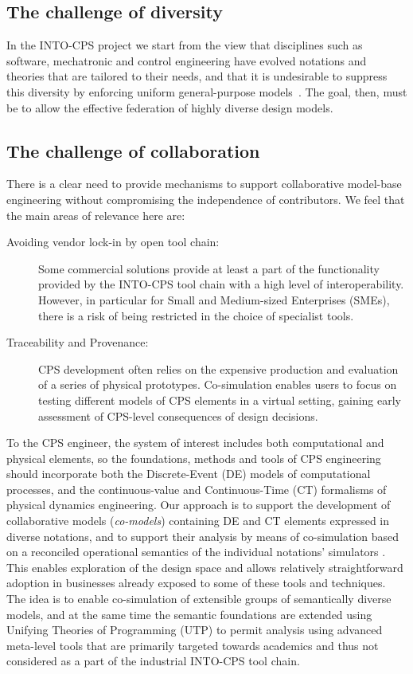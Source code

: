 \subsection{The challenge of diversity}

In the INTO-CPS project we start from the view that disciplines such as software, mechatronic and control engineering have evolved notations and theories that are tailored to their needs, and that it is undesirable to suppress this diversity by enforcing uniform general-purpose models~\cite{Fitzgerald&15,Larsen&16e}. The goal, then, must be to allow the effective federation of highly diverse design models.

\subsection{The challenge of collaboration}

There is a clear need to provide mechanisms to support collaborative model-base engineering without compromising the independence of contributors. We feel that the main areas of relevance here are:

\begin{description}
\item[Avoiding vendor lock-in by open tool chain:] Some commercial solutions provide at least a part of the functionality provided by the INTO-CPS tool chain with a high level of interoperability. However, in particular for Small and Medium-sized Enterprises (SMEs), there is a risk of being restricted in the choice of specialist tools. 
\item[Traceability and Provenance:] CPS development often relies on the expensive production and evaluation of a series of physical prototypes. Co-simulation enables users to focus on testing different models of CPS elements in a virtual setting, gaining early assessment of CPS-level consequences of design decisions.
\end{description} 



To the CPS engineer, the system of interest includes both computational and physical elements, so the foundations, methods and tools of CPS engineering should incorporate both the Discrete-Event (DE) models of computational processes, and the continuous-value and Continuous-Time (CT) formalisms of physical dynamics engineering. Our approach is to support the development of collaborative models (\emph{co-models}) containing DE and CT elements expressed in diverse notations, and to support their analysis by means of co-simulation based on a reconciled operational semantics of the individual notations' simulators \cite{Fitzgerald&14c}. This enables exploration of the design space and allows relatively straightforward adoption in businesses already exposed to some of these tools and techniques. The idea is to enable co-simulation of extensible groups of semantically diverse models, and at the same time the semantic foundations are extended using Unifying Theories of Programming (UTP) to permit analysis using advanced meta-level tools that are primarily targeted towards academics and thus not considered as a part of the industrial INTO-CPS tool chain.

